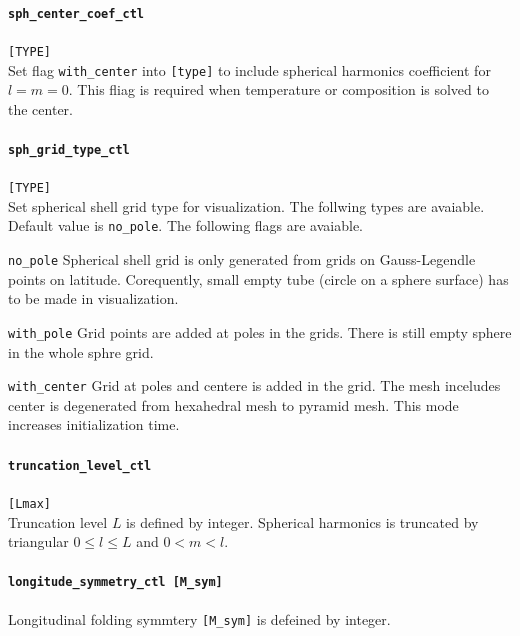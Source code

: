 \paragraph{\tt sph\_center\_coef\_ctl}
\label{href_t:sph_center_coef_ctl}
\verb|[TYPE]| \\
Set flag \verb|with_center| into \verb|[type]| to include spherical harmonics coefficient for $l = m = 0$. This fliag is required when temperature or composition is solved to the center.

\paragraph{\tt sph\_grid\_type\_ctl}
\label{href_t:sph_grid_type_ctl}
\verb|[TYPE]| \\
Set spherical shell grid type for visualization. The follwing types are avaiable. Default value is \verb|no_pole|. The following flags are avaiable.
%
\begin{description}
    \item{\tt no\_pole} Spherical shell grid is only generated from grids on Gauss-Legendle points on latitude. Corequently, small empty tube (circle on a sphere surface) has to be made in visualization.
    \item{\tt with\_pole} Grid points are added at poles in the grids. There is still empty sphere in the whole sphre grid.
    \item{\tt with\_center}  Grid at poles and centere is added in the grid. The mesh inceludes center is degenerated from hexahedral mesh to pyramid mesh. This mode increases initialization time.
\end{description}
%

\paragraph{\tt truncation\_level\_ctl}
\label{href_t:truncation_level_ctl}
\verb|[Lmax]| \\
Truncation level $L$ is defined by integer. Spherical harmonics is truncated by triangular $0 \le l \le L$ and $0 <m < l$.

\paragraph{\tt longitude\_symmetry\_ctl    [M\_sym]}
\label{href_t:longitude_symmetry_ctl}
Longitudinal folding symmtery \verb|[M_sym]| is defeined by integer.

